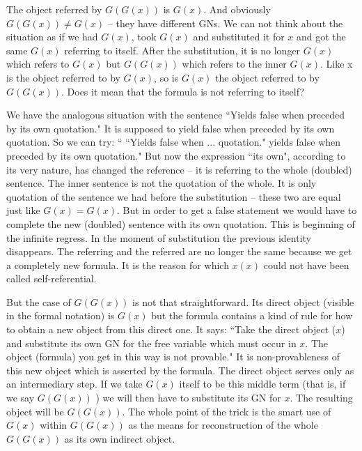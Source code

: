 The object referred by $G(G(x))$ is $G(x)$. And obviously $G(G(x))\not = G(x)$ -- they have different GNs. We can not think 
about the situation as if we had $G(x)$, took $G(x)$ and substituted it for $x$ and got the same $G(x)$ referring to 
itself. After the substitution, it is no longer $G(x)$ which refers to $G(x)$ but $G(G(x))$
 which refers to the inner $G(x)$. 
Like x is the object referred to by $G(x)$, so is $G(x)$ the object referred to by 
$G(G(x))$. Does it mean that the formula is not referring to itself?

We have the analogous situation with the sentence ``Yields false when preceded by its own quotation." It is 
supposed to yield false when preceded by its own quotation. So we can try: `` ``Yields false when ... quotation." 
yields false when preceded by its own quotation." But now the expression ``its own", according to its very nature, 
has changed the reference -- it is referring to the whole (doubled) sentence. The inner sentence is not the quotation of 
the whole. It is only quotation of the sentence we had before the substitution -- these two are equal just like $G(x)=G(x).$ 
But in order to get a false statement we would have to complete the new (doubled) sentence with its 
own quotation. This is beginning of the infinite regress. In the moment of substitution the previous 
identity disappears. The referring and the referred are no longer the same because we get a completely new formula. 
It is the reason for which $x(x)$ could not have been called self-referential.

But the case of $G(G(x))$ is not that straightforward. Its direct object (visible in the formal notation) is $G(x)$ but 
the formula contains a kind of rule for how to obtain a new object from this direct one. It says: ``Take the direct 
object ($x$) and substitute its own GN for the free variable which must occur in $x$. 
The object (formula) you get in 
this way is not provable." It is non-provableness of this new object which is asserted by the formula. The direct 
object serves only as an intermediary step. If we take $G(x)$ itself to be this middle term (that is, if we say $G(G(x))$ ) 
we will then have to substitute its GN for $x$. The resulting object will be $G(G(x))$. The whole point of the trick is 
the smart use of $G(x)$ within $G(G(x))$ as the means for reconstruction of the whole $G(G(x))$ as its own indirect 
object.

